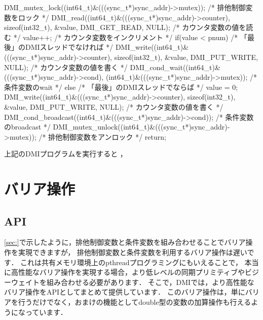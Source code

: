 \documentclass[report,12pt]{jsbook}
\begin{document}
\begin{code}
{  DMI_mutex_lock((int64_t)&(((sync_t*)sync_addr)->mutex));  /* 排他制御変数をロック */
  DMI_read((int64_t)&(((sync_t*)sync_addr)->counter), sizeof(int32_t), &value, DMI_GET_READ, NULL);  /* カウンタ変数の値を読む */
  value++;  /* カウンタ変数をインクリメント */
  if(value < pnum)  /* 「最後」のDMIスレッドでなければ */
    {
      DMI_write((int64_t)&(((sync_t*)sync_addr)->counter), sizeof(int32_t), &value, DMI_PUT_WRITE, NULL);  /* カウンタ変数の値を書く */
      DMI_cond_wait((int64_t)&(((sync_t*)sync_addr)->cond), (int64_t)&(((sync_t*)sync_addr)->mutex));  /* 条件変数のwait */
    }
  else  /* 「最後」のDMIスレッドでならば */
    {
      value = 0;
      DMI_write((int64_t)&(((sync_t*)sync_addr)->counter), sizeof(int32_t), &value, DMI_PUT_WRITE, NULL);  /* カウンタ変数の値を書く */
      DMI_cond_broadcast((int64_t)&(((sync_t*)sync_addr)->cond));  /* 条件変数のbroadcast */
    }
  DMI_mutex_unlock((int64_t)&(((sync_t*)sync_addr)->mutex));  /* 排他制御変数をアンロック */
  return;
}
\end{code}

上記のDMIプログラムを実行すると
，

\section{バリア操作}

\subsection{API}

\ref{sec:}で示したように，排他制御変数と条件変数を組み合わせることでバリア操作を実現できますが，
排他制御変数と条件変数を利用するバリア操作は遅いです．
これは共有メモリ環境上のpthreadプログラミングにもいえることで，
本当に高性能なバリア操作を実現する場合，より低レベルの同期プリミティブやビジーウェイトを組み合わせる必要があります．
そこで，DMIでは，より高性能なバリア操作をAPIとしてまとめて提供しています．
このバリア操作は，単にバリアを行うだけでなく，おまけの機能としてdouble型の変数の加算操作も行えるようになっています．
\end{document}
